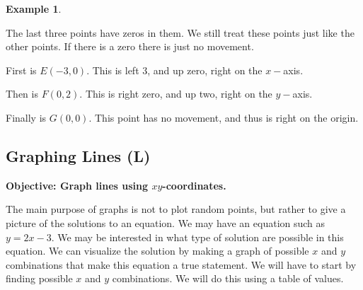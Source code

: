 \documentclass[12pt]{book}
\theoremstyle{definition}
\newtheorem{example}{Example}
\begin{document}
\begin{example}
\begin{multicols}{2}
  \columnbreak
  
   The last three points have zeros in them. We still treat these points just like the other points. If there is a zero there is just no movement.\par
   First is $E (- 3, 0)$. This is left 3, and up zero, right on the $x -$axis.\par 
   Then is $F (0, 2)$. This is right zero, and up two, right on the $y -$axis.\par
   Finally is $G (0, 0)$. This point has no movement, and thus is right on the origin.
  \end{multicols}
\end{example}
\subsection{Graphing Lines (L)}
{\bf Objective: Graph lines using $xy$-coordinates.}\par
The main purpose of graphs is not to plot random points, but rather to give a picture of the solutions to an equation. We may have an equation such as $y =2 x - 3$. We may be interested in what type of solution are possible in this equation. We can visualize the solution by making a graph of possible $x$ and $y$ combinations that make this equation a true statement. We will have to start by finding possible $x$ and $y$ combinations. We will do this using a table of values.
\end{document}
